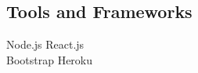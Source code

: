 \documentclass[]{deedy-resume-openfont}
\begin{document}
\begin{minipage}[t]{0.33\textwidth}
\subsection{Tools and Frameworks}
Node.js \textbullet{}   React.js \\
Bootstrap \textbullet{}
Heroku 

\sectionsep





%
%

\end{minipage} 
\hfill
\end{document}
